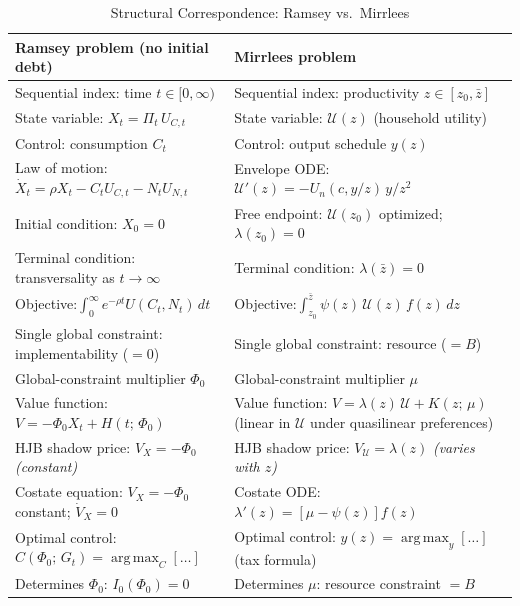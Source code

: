 \documentclass[12pt]{article}
\DeclareMathOperator*{\argmax}{arg\,max}
\newcommand{\calU}{\mathcal{U}}
\newcommand{\zbar}{\bar{z}}
\newcommand{\zlow}{z_{0}}
\begin{document}
\begin{table}[h!]
\centering
\caption{Structural Correspondence: Ramsey vs.\ Mirrlees}
\label{tab:correspondence}
\renewcommand{\arraystretch}{1.45}
\begin{tabular}{@{} p{6.2cm} p{6.2cm} @{}}
\toprule
\textbf{Ramsey problem (no initial debt)} & \textbf{Mirrlees problem} \\
\midrule
Sequential index: time $t \in [0,\infty)$ &
Sequential index: productivity $z \in [\zlow, \zbar]$ \\

State variable: $X_t = \Pi_t\, U_{C,t}$ &
State variable: $\calU(z)$ (household utility) \\

Control: consumption $C_t$ &
Control: output schedule $y(z)$ \\

Law of motion:
$\dot{X}_t = \rho X_t - C_t U_{C,t} - N_t U_{N,t}$ &
Envelope ODE:
$\calU'(z) = -U_n(c, y/z)\, y/z^2$ \\

Initial condition: $X_0 = 0$ &
Free endpoint: $\calU(\zlow)$ optimized; $\lambda(\zlow)=0$ \\

Terminal condition: transversality as $t\to\infty$ &
Terminal condition: $\lambda(\zbar)=0$ \\

Objective:\newline $\displaystyle\int_0^\infty e^{-\rho t} U(C_t, N_t)\, dt$ &
Objective:\newline $\displaystyle\int_{\zlow}^{\zbar} \psi(z)\, \calU(z)\, f(z)\, dz$ \\

Single global constraint: implementability ($=0$) &
Single global constraint: resource ($=B$) \\

Global-constraint multiplier $\Phi_0$ &
Global-constraint multiplier $\mu$ \\

Value function: $V = -\Phi_0 X_t + H(t;\, \Phi_0)$ &
Value function: $V = \lambda(z)\, \calU + K(z;\, \mu)$\newline
(linear in $\calU$ under quasilinear preferences) \\

HJB shadow price: $V_X = -\Phi_0$ \emph{(constant)} &
HJB shadow price: $V_\calU = \lambda(z)$ \emph{(varies with $z$)} \\

Costate equation:
$V_X = -\Phi_0$ constant; $\dot{V}_X = 0$ &
Costate ODE:
$\lambda'(z) = [\mu - \psi(z)] f(z)$ \\

Optimal control: $C(\Phi_0;\, G_t) = \displaystyle\argmax_C [\ldots]$ &
Optimal control: $y(z) = \argmax_y [\ldots]$ (tax formula) \\

Determines $\Phi_0$: $I_0(\Phi_0) = 0$ &
Determines $\mu$: resource constraint $= B$ \\
\bottomrule
\end{tabular}
\end{table}
\end{document}
